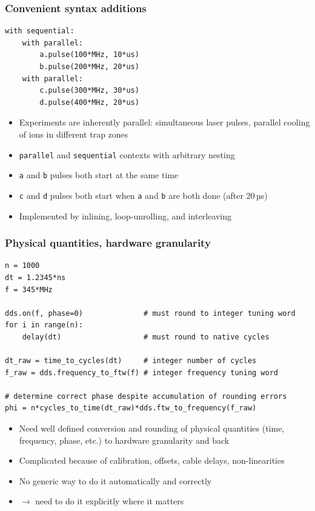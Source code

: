 \documentclass[final,presentation,compress]{beamer}
\begin{document}
\begin{frame}[fragile]
  \frametitle{Convenient syntax additions}
  \footnotesize
  \begin{verbatim}
with sequential:
    with parallel:
        a.pulse(100*MHz, 10*us)
        b.pulse(200*MHz, 20*us)
    with parallel:
        c.pulse(300*MHz, 30*us)
        d.pulse(400*MHz, 20*us)
  \end{verbatim}

  \begin{itemize}
    \item Experiments are inherently parallel:
        simultaneous laser pulses, parallel cooling of ions in different trap zones
    \item \verb!parallel! and \verb!sequential! contexts with arbitrary nesting
    \item \verb!a! and \verb!b! pulses both start at the same time
    \item \verb!c! and \verb!d! pulses both start when \verb!a! and \verb!b! are both done
      (after 20\,µs)
    \item Implemented by inlining, loop-unrolling, and interleaving
  \end{itemize}
\end{frame}


\begin{frame}[fragile]
  \frametitle{Physical quantities, hardware granularity}
  \footnotesize
  \begin{verbatim}
n = 1000
dt = 1.2345*ns
f = 345*MHz

dds.on(f, phase=0)              # must round to integer tuning word
for i in range(n):
    delay(dt)                   # must round to native cycles

dt_raw = time_to_cycles(dt)     # integer number of cycles
f_raw = dds.frequency_to_ftw(f) # integer frequency tuning word

# determine correct phase despite accumulation of rounding errors
phi = n*cycles_to_time(dt_raw)*dds.ftw_to_frequency(f_raw)
  \end{verbatim}

  \begin{itemize}
    \item Need well defined conversion and rounding of physical quantities
      (time, frequency, phase, etc.) to hardware granularity and back
    \item Complicated because of calibration, offsets, cable delays,
      non-linearities
    \item No generic way to do it automatically and correctly
    \item $\rightarrow$ need to do it explicitly where it matters
  \end{itemize}
\end{frame}
\end{document}
